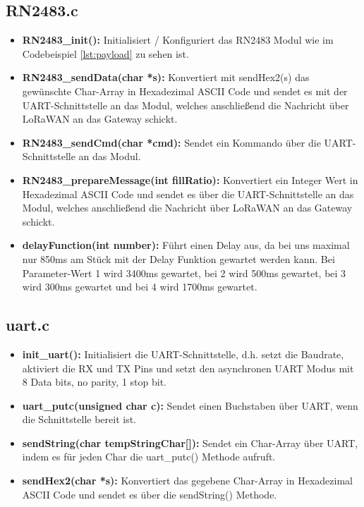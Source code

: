 \subsection{RN2483.c}
\begin{itemize}
    \item \textbf{RN2483\_init():} Initialisiert / Konfiguriert das RN2483 Modul wie im Codebeispiel \ref{lst:payload} zu sehen ist.
    \item \textbf{RN2483\_sendData(char *s):} Konvertiert mit sendHex2(s) das gewünschte Char-Array in Hexadezimal ASCII Code und sendet es mit der UART-Schnittstelle an das Modul, welches anschließend die Nachricht über LoRaWAN an das Gateway schickt.
    \item \textbf{RN2483\_sendCmd(char *cmd):} Sendet ein Kommando über die UART-Schnittstelle an das Modul.
    \item \textbf{RN2483\_prepareMessage(int fillRatio):} Konvertiert ein Integer Wert in Hexadezimal ASCII Code und sendet es über die UART-Schnittstelle an das Modul, welches anschließend die Nachricht über LoRaWAN an das Gateway schickt.
    \item \textbf{delayFunction(int number):} Führt einen Delay aus, da bei uns maximal nur 850ms am Stück mit der Delay Funktion gewartet werden kann. Bei Parameter-Wert 1 wird 3400ms gewartet, bei 2 wird 500ms gewartet, bei 3 wird 300ms gewartet und bei 4 wird 1700ms gewartet. 
\end{itemize}
\subsection{uart.c}
\begin{itemize}
    \item \textbf{init\_uart():} Initialisiert die UART-Schnittstelle, d.h. setzt die Baudrate, aktiviert die RX und TX Pins und setzt den asynchronen UART Modus mit 8 Data bits, no parity, 1 stop bit. 
    \item \textbf{uart\_putc(unsigned char c):} Sendet einen Buchstaben über UART, wenn die Schnittstelle bereit ist.
    \item \textbf{sendString(char tempStringChar[]):} Sendet ein Char-Array über UART, indem es für jeden Char die uart\_putc() Methode aufruft. 
    \item \textbf{sendHex2(char *s):} Konvertiert das gegebene Char-Array in Hexadezimal ASCII Code und sendet es über die sendString() Methode.
\end{itemize}
\newpage


